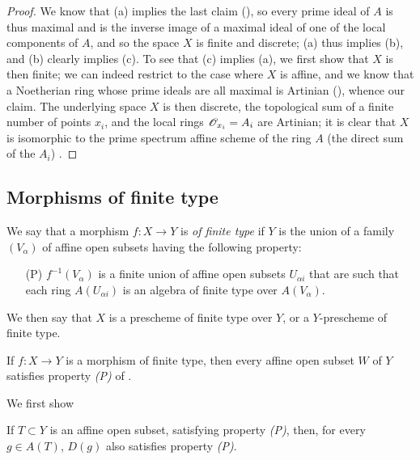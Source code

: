 \begin{proof}
\label{proof-1.6.2.2}
We know that (a) implies the last claim (\cite[p.~205, th.~3]{I-13}), so every prime ideal of $A$ is thus maximal and is the inverse image of a maximal ideal of one of the local components of $A$, and so the space $X$ is finite and discrete;
(a) thus implies (b), and (b) clearly implies (c).
To see that (c) implies (a), we first show that $X$ is then finite;
we can indeed restrict to the case where $X$ is affine, and we know that a Noetherian ring whose prime ideals are all maximal is Artinian (\cite[p.~203]{I-13}), whence our claim.
The underlying space $X$ is then discrete, the topological sum of a finite number of points $x_i$, and the local rings $\mathscr{O}_{x_i}=A_i$ are Artinian;
it is clear that $X$ is isomorphic to the prime spectrum affine scheme of the ring $A$ (the direct sum of the $A_i$) .
\end{proof}

\subsection{Morphisms of finite type}
\label{subsection:I.6.3}

\begin{definition}[6.3.1]
\label{I.6.3.1}
We say that a morphism $f:X\to Y$ is \emph{of finite type} if $Y$ is the union of a family $(V_\alpha)$ of affine open subsets having the following property:
\begin{enumerate}
  \item[(P)] $f^{-1}(V_\alpha)$ is a finite union of affine open subsets $U_{\alpha i}$ that are such that each ring $A(U_{\alpha i})$ is an algebra of finite type over $A(V_\alpha)$.
\end{enumerate}
We then say that $X$ is a prescheme of finite type over $Y$, or a $Y$-prescheme of finite type.
\end{definition}

\begin{proposition}[6.3.2]
\label{I.6.3.2}
If $f:X\to Y$ is a morphism of finite type, then every affine open subset $W$ of $Y$ satisfies property \emph{(P)} of .
\end{proposition}

We first show
\begin{lemma}[6.3.2.1]
\label{I.6.3.2.1}
If $T\subset Y$ is an affine open subset, satisfying property \emph{(P)}, then, for every $g\in A(T)$, $D(g)$ also satisfies property \emph{(P)}.
\end{lemma}

